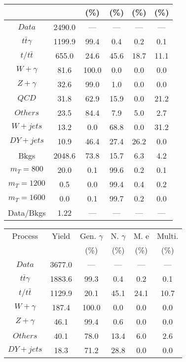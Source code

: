 \begin{figure}
\begin{minipage}[c]{0.32\textwidth}
{\begin{tabular}{cccccc}
 &  & (\%) & (\%) & (\%) & (\%)  \\
\hline
                                                                      $ Data $ &  2490.0 &  --- &  --- &  --- &  ---\\
$ t\bar{t}\gamma $ &  1199.9 &  99.4 &  0.4 &  0.2 &  0.1\\
$ t/t\bar{t} $ &  655.0 &  24.6 &  45.6 &  18.7 &  11.1\\
$ W+\gamma $ &  81.6 &  100.0 &  0.0 &  0.0 &  0.0\\
$ Z+\gamma $ &  32.6 &  99.0 &  1.0 &  0.0 &  0.0\\
$ QCD $ &  31.8 &  62.9 &  15.9 &  0.0 &  21.2\\
$ Others $ &  23.5 &  84.4 &  7.9 &  5.0 &  2.7\\
$ W+jets $ &  13.2 &  0.0 &  68.8 &  0.0 &  31.2\\
$ DY+jets $ &  10.9 &  46.4 &  27.4 &  26.2 &  0.0\\
Bkgs &  2048.6 &  73.8 &  15.7 &  6.3 &  4.2\\
$ m_{T} = 800 $ &  20.0 &  0.1 &  99.6 &  0.2 &  0.1\\
$ m_{T} = 1200 $ &  0.5 &  0.0 &  99.4 &  0.4 &  0.2\\
$ m_{T} = 1600 $ &  0.0 &  0.1 &  99.7 &  0.2 &  0.0\\
Data/Bkgs &  1.22 &  --- &  --- &  --- &  ---\\
\hline
\end{tabular}
}
\end{minipage}
\begin{minipage}[c]{0.32\textwidth}
\centering
\tiny{
\begin{tabular}{cccccc}
\hline
Process & Yield & Gen. $\gamma$ & N. $\gamma$ & M. e & Multi. \\
 &  & (\%) & (\%) & (\%) & (\%)  \\
\hline
                                                                      $ Data $ &  3677.0 &  --- &  --- &  --- &  ---\\
$ t\bar{t}\gamma $ &  1883.6 &  99.3 &  0.4 &  0.2 &  0.1\\
$ t/t\bar{t} $ &  1129.9 &  20.1 &  45.1 &  24.1 &  10.7\\
$ W+\gamma $ &  187.4 &  100.0 &  0.0 &  0.0 &  0.0\\
$ Z+\gamma $ &  46.1 &  99.4 &  0.6 &  0.0 &  0.0\\
$ Others $ &  40.1 &  78.0 &  13.4 &  6.0 &  2.6\\
$ DY+jets $ &  18.3 &  71.2 &  28.8 &  0.0 &  0.0\\

\end{tabular}}
\end{minipage}
\end{figure}
